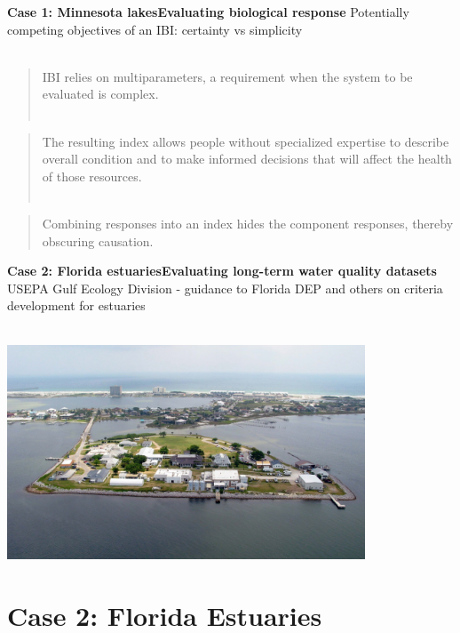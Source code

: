 \documentclass[serif]{beamer}\usepackage[]{graphicx}\usepackage[]{color}
\begin{document}
\begin{frame}{\textbf{Case 1: Minnesota lakes}}{\textbf{Evaluating biological response}}
Potentially competing objectives of an IBI: certainty vs simplicity \\~\\
\pause
\begin{quote}
IBI relies on multiparameters, a requirement when the system to be evaluated is complex. \cite{Karr86} \\~\\
\end{quote}
\begin{quote}
The resulting index allows people without specialized expertise to describe overall condition and to make informed decisions that will affect the health of those resources. \cite{Karr99} \\~\\
\end{quote}
\pause
\begin{quote}
Combining responses into an index hides the component responses, thereby obscuring causation. \cite{Suter93}
\end{quote}
\end{frame}

\begin{frame}{\textbf{Case 2: Florida estuaries}}{\textbf{Evaluating long-term water quality datasets}}
USEPA Gulf Ecology Division - guidance to Florida DEP and others on criteria development for estuaries \\~\\
\centerline{\includegraphics[width = 0.8\textwidth]{fig/sabine.pdf}}
\end{frame}

\section{Case 2: Florida Estuaries}
\end{document}
